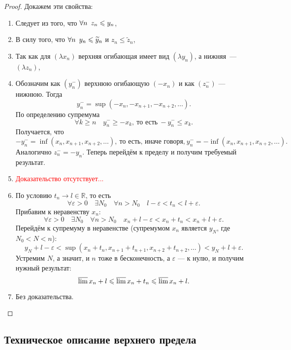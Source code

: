 \begin{proof}
	Докажем эти свойства:
	\begin{enumerate}
		\item Следует из того, что \(\forall n \enskip z_n \leqslant y_n\),
		\item В силу того, что \(\forall n \enskip y_n \leqslant \widetilde{y}_n\) и \(z_n \leqslant \widetilde{z}_n\),
		\item Так как для \((\lambda x_n)\) верхняя огибающая имеет вид \((\lambda y_n)\), а нижняя~--- \((\lambda z_n)\),
		\item Обозначим как \((y_n^-)\) верхнюю огибающую \((-x_n)\) и как \((z_n^-)\) --- нижнюю. Тогда \[
		y_n^- = \sup(-x_n, -x_{n + 1}, -x_{n + 2}, \ldots).
		\]
		По определению супремума \[
		\forall k \geqslant n \quad y_n^- \geqslant -x_k, \ \text{то есть} \ -y_n^- \leqslant x_k.
		\]
		Получается, что \[
			-y_n^- = \inf(x_n, x_{n + 1}, x_{n + 2}, \ldots), \ \text{то есть, иначе говоря,} \ y_n^- = -\inf(x_n, x_{n + 1}, x_{n + 2}, \ldots).
		\]
		Аналогично \(z_n^- = -y_n\). Теперь перейдём к пределу и получим требуемый результат.
		\item \textcolor{red}{Доказательство отсутствует...}
		\item По условию \(t_n \to l \in \mathbb{R}\), то есть \[
		\forall \varepsilon > 0 \quad \exists N_0 \quad \forall n > N_0 \quad l - \varepsilon < t_n < l + \varepsilon.
		\]
		Прибавим к неравенству \(x_n\): \[
		\forall \varepsilon > 0 \quad \exists N_0 \quad \forall n > N_0 \quad x_n + l - \varepsilon < x_n + t_n < x_n + l + \varepsilon.
		\]
		Перейдём к супремуму в неравенстве (супремумом \(x_n\) является \(y_{N}\), где \(N_0 < N < n\)): \[
		y_N + l - \varepsilon < \sup(x_n + t_n, x_{n + 1} + t_{n + 1}, x_{n + 2} + t_{n + 2}, \ldots) < y_N + l + \varepsilon.
		\]
		Устремим \(N\), а значит, и \(n\) тоже в бесконечность, а \(\varepsilon\) --- к нулю, и получим нужный результат: \[
		\varlimsup x_n + l \leqslant \varlimsup x_n + t_n \leqslant \varlimsup x_n + l.
		\]
		\item Без доказательства.
	\end{enumerate}
\end{proof}

\subsection{Техническое описание верхнего предела}

